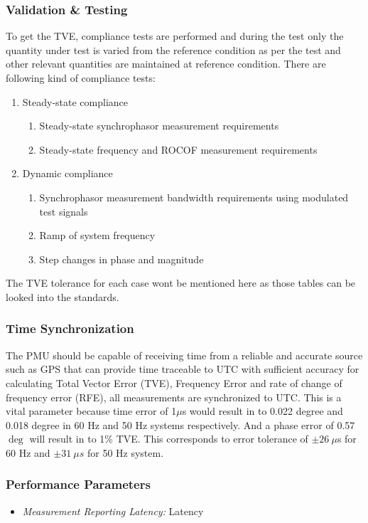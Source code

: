 \subsubsection{Validation \& Testing }

To get the TVE, compliance tests are performed and during the test only the quantity under test is varied from the reference condition as per the test and other relevant quantities are maintained at reference condition. There are following kind of compliance tests:
\begin{enumerate}
	\item Steady-state compliance
	\begin{enumerate}
		\item Steady-state synchrophasor measurement requirements
		\item Steady-state frequency and ROCOF measurement requirements
	\end{enumerate}
	\item Dynamic compliance
	\begin{enumerate}
		\item Synchrophasor measurement bandwidth requirements using modulated test signals
		\item Ramp of system frequency
		\item Step changes in phase and magnitude
	\end{enumerate}
\end{enumerate} 
The TVE tolerance for each case wont be mentioned here as those tables can be looked into the standards.


\subsubsection{Time Synchronization}

The PMU should be capable of receiving time from a reliable and accurate source such as GPS that can provide time traceable to UTC with sufficient accuracy for calculating Total Vector Error (TVE), Frequency Error and rate of change of frequency error (RFE), all measurements are synchronized to UTC.
This is a vital parameter because time error of 1$\mu$s would result in to 0.022 degree and 0.018 degree in 60 Hz and 50 Hz systems respectively. And a phase error of 0.57$\deg$ will result in to 1\% TVE. This corresponds to error tolerance of $\pm26 ~\mu$s for 60 Hz and $\pm 31 ~\mu s$ for 50 Hz system.

\subsubsection{Performance Parameters}

\begin{itemize}
	\item \textit{Measurement Reporting Latency:} Latency 
\end{itemize}


